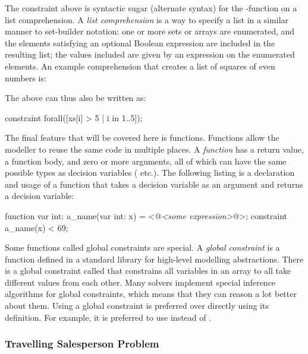 \documentclass[a4paper,12pt]{article}
\begin{document}
The  constraint above is syntactic sugar (alternate syntax) for the -function on a list comprehension.
A \emph{list comprehension} is a way to specify a list in a similar manner to set-builder notation:
one or more sets or arrays are enumerated, and the elements satisfying an optional Boolean expression are included in the resulting list;
the values included are given by an expression on the enumerated elements.
An example comprehension that creates a list of squares of even numbers is:
\begin{mznnobreak}
[x*x | x in 1..50 where x mod 2 = 0]
\end{mznnobreak}

The  above can thus also be written as:
\begin{mznnobreak}
constraint forall([xs[i] > 5 | i in 1..5]);
\end{mznnobreak}

The final feature that will be covered here is functions. Functions allow the modeller to
reuse the same code in multiple places. A \emph{function} has a return value, a function body, and zero or more
arguments, all of which can have the same possible types as
decision variables ( etc.). The following listing is a declaration and usage of a function that takes a decision variable as
an argument and returns a decision variable:
\begin{mznnobreak}
function var int: a_name(var int: x) = <@\textit{<some expression>}@>;
constraint a_name(x) < 69;
\end{mznnobreak}

\begin{sloppypar}
Some functions called global constraints are special. A \emph{global constraint} is a
function defined in a standard library for high-level modelling abstractions. There is
a global constraint called  that constrains all variables in an array to
all take different values from each other. Many solvers implement special inference algorithms for
global constraints, which means that they can reason a lot better about them.
Using a global constraint is preferred over directly using its definition.
For example, it is preferred to use  instead of
.
\end{sloppypar}

\subsubsection{Travelling Salesperson Problem}\label{sec:tsp}
\end{document}
